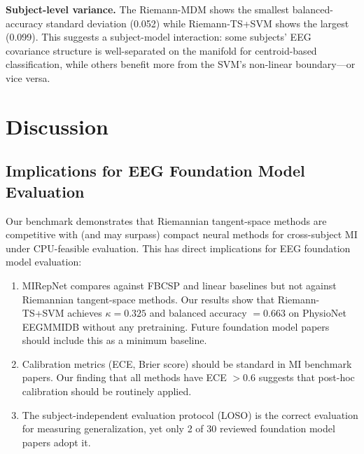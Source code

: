 \documentclass[conference]{IEEEtran}
\begin{document}
\textbf{Subject-level variance.}
The Riemann-MDM shows the smallest balanced-accuracy standard deviation
(0.052) while Riemann-TS+SVM shows the largest (0.099). This suggests a
subject-model interaction: some subjects' EEG covariance structure is
well-separated on the manifold for centroid-based classification, while
others benefit more from the SVM's non-linear boundary—or vice versa.

\section{Discussion}
\label{sec:discussion}

\subsection{Implications for EEG Foundation Model Evaluation}

Our benchmark demonstrates that Riemannian tangent-space methods are competitive
with (and may surpass) compact neural methods for cross-subject MI under
CPU-feasible evaluation. This has direct implications for EEG foundation model
evaluation:

\begin{enumerate}
\item MIRepNet \cite{mireNet2025} compares against FBCSP and linear baselines
  but not against Riemannian tangent-space methods. Our results show that
  Riemann-TS+SVM achieves $\kappa = 0.325$ and balanced accuracy $= 0.663$ on
  PhysioNet EEGMMIDB without any pretraining. Future foundation model papers
  should include this as a minimum baseline.
\item Calibration metrics (ECE, Brier score) should be standard in MI benchmark
  papers. Our finding that all methods have ECE $> 0.6$ suggests that post-hoc
  calibration should be routinely applied.
\item The subject-independent evaluation protocol (LOSO) is the correct evaluation
  for measuring generalization, yet only 2 of 30 reviewed foundation model
  papers adopt it.
\end{enumerate}
\end{document}
